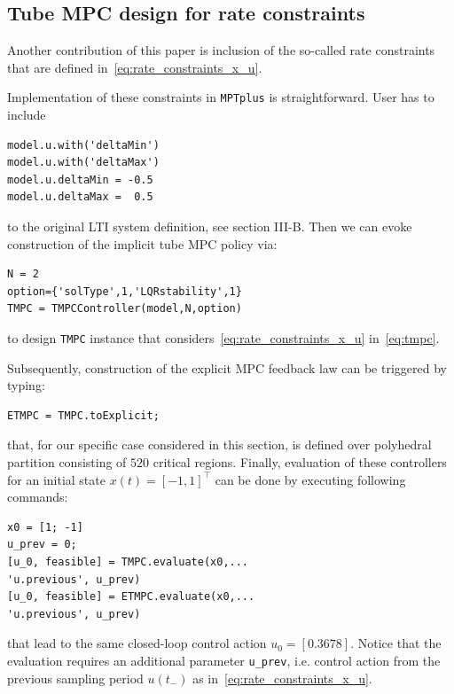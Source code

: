 \documentclass[letterpaper, 10 pt, conference]{ieeeconf}
\begin{document}


\subsection{Tube MPC design for rate constraints}
\label{sec:mptplus_tube_mpc_delta_u}

Another contribution of this paper is inclusion of the so-called rate constraints that are defined in~\eqref{eq:rate_constraints_x_u}.

Implementation of these constraints in \texttt{MPTplus} is straightforward. User has to include 
\begin{lstlisting}[style=Matlab-editor]
model.u.with('deltaMin')
model.u.with('deltaMax')
model.u.deltaMin = -0.5
model.u.deltaMax =  0.5
\end{lstlisting}
to the original LTI system definition, see section III-B. Then we can evoke construction of the implicit tube MPC policy via:
\begin{lstlisting}[style=Matlab-editor]
N = 2
option={'solType',1,'LQRstability',1}
TMPC = TMPCController(model,N,option)
\end{lstlisting}
to design \texttt{TMPC} instance that considers~\eqref{eq:rate_constraints_x_u} in~\eqref{eq:tmpc}.

Subsequently, construction of the explicit MPC feedback law can be triggered by typing:
\begin{lstlisting}[style=Matlab-editor]
ETMPC = TMPC.toExplicit;
\end{lstlisting}
that, for our specific case considered in this section, is defined over polyhedral partition consisting of $520$ critical regions.
Finally, evaluation of these controllers for an initial state $x(t) = [-1, 1]^\top$ can be done by executing following commands:
\begin{lstlisting}[style=Matlab-editor]
x0 = [1; -1]
u_prev = 0;
[u_0, feasible] = TMPC.evaluate(x0,...
'u.previous', u_prev)
[u_0, feasible] = ETMPC.evaluate(x0,...
'u.previous', u_prev)
\end{lstlisting}
that lead to the same closed-loop control action $u_0 = [0.3678]$.
Notice that the evaluation requires an additional parameter \verb|u_prev|, i.e. control action from the previous sampling period $u(t_{-})$ as in~\eqref{eq:rate_constraints_x_u}.
\end{document}
